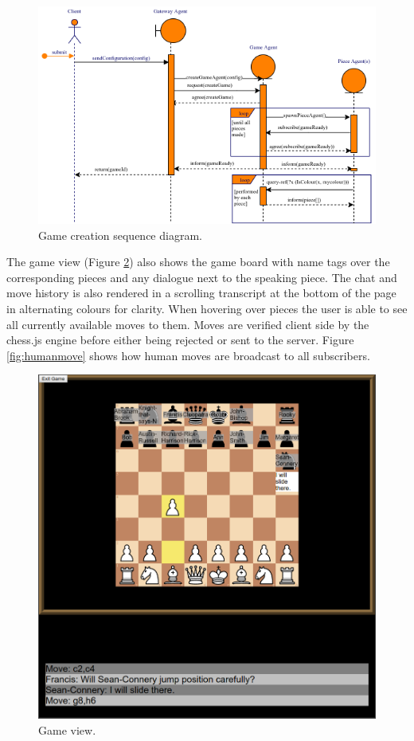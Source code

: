 \documentclass[conference]{IEEEtran}
\begin{document}
\begin{figure}[!h]
	\centering
	\includegraphics[width=\linewidth]{images/gamecreation}
	\caption{Game creation sequence diagram.}
	\label{fig:gamecreation}
\end{figure}

The game view (Figure \ref{fig:gameview}) also shows the game board with name tags over the corresponding pieces and any dialogue next to the speaking piece. The chat and move history is also rendered in a scrolling transcript at the bottom of the page in alternating colours for clarity. When hovering over pieces the user is able to see all currently available moves to them. Moves are verified client side by the chess.js \cite{chessjs} engine before either being rejected or sent to the server. Figure \ref{fig:humanmove} shows how human moves are broadcast to all subscribers.

\begin{figure}[!h]
	\centering
	\includegraphics[width=\linewidth]{images/gameview}
	\caption{Game view.}
	\label{fig:gameview}
\end{figure}
\end{document}
